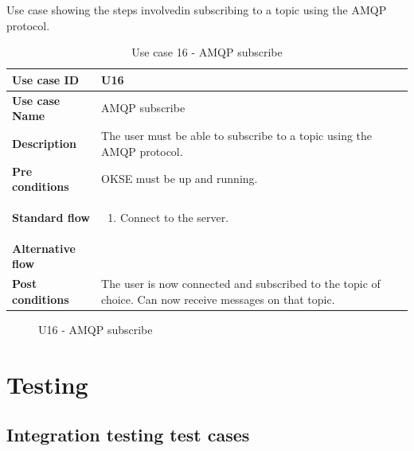 Use case showing the steps involvedin subscribing to a topic using the AMQP protocol.   

\begin{table}[ht!]
\centering
\begin{tabular}{|l|p{5cm}|}
\hline
\textbf{Use case ID} & U16 \\ \hline
\textbf{Use case Name} & AMQP subscribe\\ \hline
\textbf{Description} & The user must be able to subscribe to a topic using the AMQP protocol. \\ \hline
\textbf{Pre conditions} & OKSE must be up and running. \\ \hline
\textbf{Standard flow} & \begin{enumerate}
\item Connect to the server.
\end{enumerate} \\ \hline
\textbf{Alternative flow} & \\ \hline
\textbf{Post conditions} & The user is now connected and subscribed to the topic of choice. Can now receive messages on that topic. \\ \hline
\end{tabular}
\caption{Use case 16 - AMQP subscribe}
\label{uc16}
\end{table}

\begin{center}
  \begin{figure}[ht!]
    \caption{U16 - AMQP subscribe}
    \label{fig:u16}
  \end{figure}
\end{center}

\clearpage

\section{Testing}
\label{sec:appendix-testing}

\subsection{Integration testing test cases}


